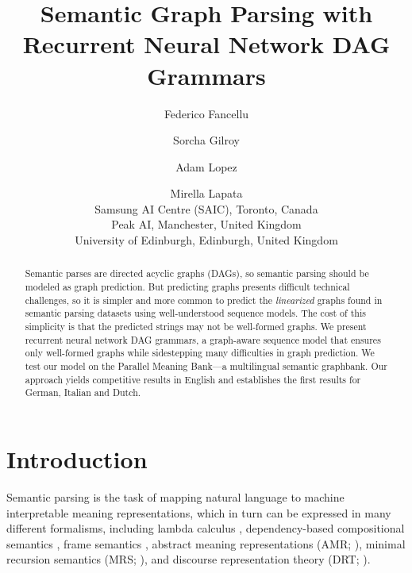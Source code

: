 \documentclass[11pt,a4paper]{article}
\title{Semantic Graph Parsing with Recurrent Neural Network DAG Grammars}
\author{Federico Fancellu \and Sorcha Gilroy \and Adam Lopez \and Mirella Lapata\\
Samsung AI Centre (SAIC), Toronto, Canada\\
Peak AI, Manchester, United Kingdom\\
University of Edinburgh, Edinburgh, United Kingdom}
\date{}
\theoremstyle{plain}
\begin{document}
\maketitle
\begin{abstract}
 Semantic parses are directed acyclic graphs (DAGs), so semantic parsing should be modeled as graph prediction. But predicting graphs presents difficult technical challenges, so it is simpler and more common to predict the \emph{linearized} graphs found in semantic parsing datasets using well-understood sequence models. The cost of this simplicity is that the predicted strings may not be well-formed graphs. We present recurrent neural network DAG grammars, a graph-aware sequence model that ensures only well-formed graphs while sidestepping many difficulties in graph prediction. We test our model on the Parallel Meaning Bank---a multilingual semantic graphbank. Our approach yields competitive results in English and establishes the first results for German, Italian and Dutch.
\end{abstract}

\section{Introduction}
\label{sec:introduction-1}

Semantic parsing is the task of mapping natural language to machine
interpretable meaning representations, which in turn can be expressed
in many different formalisms, including lambda calculus
\cite{Montague:1973}, dependency-based compositional semantics
\cite{liang2011learning}, frame semantics \cite{baker1998berkeley},
abstract meaning representations (AMR; \citealt{amr}), minimal
recursion semantics (MRS; \citealt{copestake2005minimal}), and
discourse representation theory (DRT; \citealt{kamp1981theory}).
\end{document}

